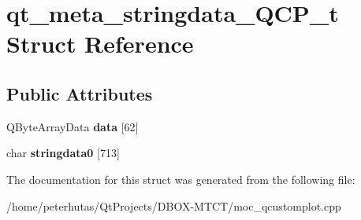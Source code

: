 \hypertarget{structqt__meta__stringdata___q_c_p__t}{}\section{qt\+\_\+meta\+\_\+stringdata\+\_\+\+Q\+C\+P\+\_\+t Struct Reference}
\label{structqt__meta__stringdata___q_c_p__t}
\subsection*{Public Attributes}
\begin{DoxyCompactItemize}
\item 
\mbox{\label{structqt__meta__stringdata___q_c_p__t_abc9c399ac75b9d32e347271273ccd5b6}} 
Q\+Byte\+Array\+Data {\bfseries data} \mbox{[}62\mbox{]}
\item 
\mbox{\label{structqt__meta__stringdata___q_c_p__t_a884365a57221bf71e4c60c1e2a9fc5f2}} 
char {\bfseries stringdata0} \mbox{[}713\mbox{]}
\end{DoxyCompactItemize}


The documentation for this struct was generated from the following file\+:\begin{DoxyCompactItemize}
\item 
/home/peterhutas/\+Qt\+Projects/\+D\+B\+O\+X-\/\+M\+T\+C\+T/moc\+\_\+qcustomplot.\+cpp\end{DoxyCompactItemize}

